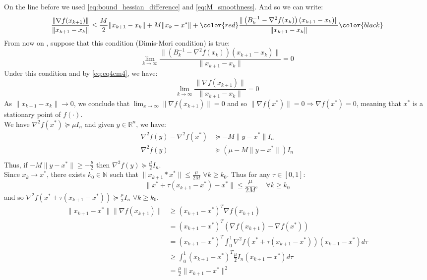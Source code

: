 \documentclass[12pt, openany]{report}
\newcommand{\R}{\mathbb{R}}
\newcommand{\N}{\mathbb{N}}
\theoremstyle{definition}
\begin{document}
On the line before we used \eqref{eq:bound_hessian_difference} and \eqref{eq:M_smoothness}. And so we can write:
\begin{equation}\label{eq:eq4cm4}
	\frac{\|\nabla f(x_{k+1})\|}{\|x_{k+1}-x_k\|} \leq \frac{M}{2} \|x_{k+1}-x_k\| + M \|x_k - x^* \| + \color{red} \frac{\|\left(B_k^{-1}-\nabla^2f(x_k)\right)(x_{k+1}-x_k)\|}{\|x_{k+1}-x_k\|}\color{black}
\end{equation}
From now on , suppose that this condition (Dimis-Mori condition) is true:
\begin{equation}\label{eq:dimis_mori_condition}
	\lim_{k\to \infty} \frac{\|\left(B_k^{-1}-\nabla^2f(x_k)\right)(x_{k+1}-x_k)\|}{\|x_{k+1}-x_k\|} = 0
\end{equation}
Under this condition and by \eqref{eq:eq4cm4}, we have:
\begin{equation}
	\lim_{k \to \infty} \frac{\|\nabla f(x_{k+1})\|}{\|x_{k+1}-x_k\|} = 0
\end{equation}
As $\|x_{k+1}-x_k\| \to 0$, we conclude that $\lim_{x \to \infty} \|\nabla f(x_{k+1})\| = 0$ and so $\|\nabla f(x^*)\| = 0 \Rightarrow \nabla f(x^*) = 0$, meaning that $x^*$ is a stationary point of $f(\cdot)$.\\
We have $\nabla^2 f(x^*) \succeq \mu I_n$ and given $y \in \R^n$, we have:
\begin{equation}
	\begin{aligned}
		\nabla^2f(y)-\nabla^2f(x^*) &\succeq - M \|y-x^*\| I_n\\
		\nabla^2f(y) &\succeq (\mu - M \|y-x^*\|) I_n\\
	\end{aligned}
\end{equation}
Thus, if $-M \|y-x^*\| \geq - \frac{\mu}{2}$ then $\nabla^2f(y) \succeq \frac{\mu}{2} I_n$.\\
Since $x_k \to x^*$, there exists $k_0 \in \N$ such that $\|x_{k+1}*x^*\| \leq \frac{\mu}{2M}$ $\forall k \geq k_0$. Thus for any $\tau \in [0,1]$:
\begin{equation}
	\|x^*+\tau(x_{k+1}-x^*)-x^*\| \leq \frac{\mu}{2M}, \quad \forall k \geq k_0
\end{equation}
and so $\nabla^2f(x^*+\tau(x_{k+1}-x^*)) \succeq \frac{\mu}{2} I_n$ $\forall k \geq k_0$.
\begin{equation}
	\begin{aligned}
		\|x_{k+1}-x^*\|\|\nabla f(x_{k+1})\| &\geq (x_{k+1}-x^*)^T\nabla f(x_{k+1})\\
		&= (x_{k+1}-x^*)^T \left( \nabla f(x_{k+1}) - \nabla f(x^*)\right)\\
		&= (x_{k+1}-x^*)^T \int_{0}^{1} \nabla^2 f(x^*+\tau(x_{k+1}-x^*)) (x_{k+1}-x^*) d\tau\\
		&\geq \int_{0}^{1} (x_{k+1}-x^*)^T \frac{\mu}{2} I_n (x_{k+1}-x^*) d\tau\\
		&= \frac{\mu}{2} \|x_{k+1}-x^*\|^2
	\end{aligned}
\end{equation}
\end{document}
